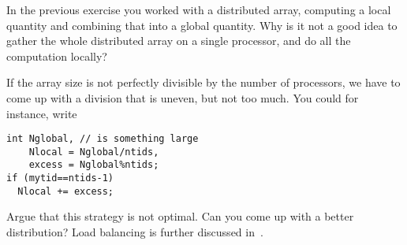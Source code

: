 \begin{comment}
  \begin{exercise}
    \label{ex:sumsquares}
    We want to compute $\sum_{n=1}^Nn^2$, and we do that as follows
    by filling in an array and summing the elements. (Yes, you can do it
    without an array, but for purposes of the exercise do it with.)

    Set a variable \n{N} for the total length of the array, and compute
    the local number of elements. Make sure you handle the case where
    $N$ does not divide perfectly by the number of processes.

    \begin{itemize}
    \item Now allocate the local parts: each processor should allocate
      only local elements, not the whole vector.\\
      (Allocate your array as real numbers. Why are integers not a good idea?)
    \item On each processor, initialize the local array
      so that the $i$-th location of the distributed array
      (for $i=0,\ldots,N-1$)
      contains~$(i+\nobreak 1)^2$.
    \item Now use a collective operation to compute the sum of the array values.
      The right value is $(2N^3+3N^2+N)/6$. Is that what you get?
    \end{itemize}
    (Note that computer arithmetic is not exact: the computed sum will
    only be accurate up to some relative accuracy.)
  \end{exercise}
\end{comment}

\begin{exercise}
  In the previous exercise you worked with a distributed array,
  computing a local quantity and combining that into a global
  quantity.
  Why is it not a good idea to gather the whole distributed array on a
  single processor, and do all the computation locally?
\end{exercise}

If the array size is not perfectly divisible by the number of processors,
we have to come up with a division that is uneven, but not too much.
You could for instance, write
\begin{lstlisting}
int Nglobal, // is something large
    Nlocal = Nglobal/ntids,
    excess = Nglobal%ntids;
if (mytid==ntids-1) 
  Nlocal += excess;
\end{lstlisting}

\begin{exercise}
  Argue that this strategy is not optimal. Can you come up with a
  better distribution?
  Load balancing is further discussed in~.
\end{exercise}

